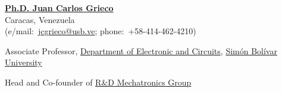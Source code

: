 \documentclass[10pt]{article}
\renewcommand{\section}[1]{\pagebreak[3]%
    \vspace{1.3\baselineskip}%
    \phantomsection\addcontentsline{toc}{section}{#1}%
    \noindent\llap{\scshape\smash{\parbox[t]{\marginparwidth}{\hyphenpenalty=10000\raggedright #1}}}%
    \vspace{-\baselineskip}\par}
\newcommand{\halfblankline}{\quad\vspace{-0.5\baselineskip}\pagebreak[3]}
\begin{document}
\halfblankline

\href{http://www.labc.usb.ve/mecatronica/quienes_somos.html}
{\textbf{Ph.D. Juan Carlos Grieco}}\\
Caracas, Venezuela\\
(e\-/mail:~\href{mailto:jcgrieco@usb.ve}{jcgrieco@usb.ve}; phone:~+58-414-462-4210)
%
\begin{innerlist}
    \item Associate Professor,
        \href{http://www.labc.usb.ve/EC/}{Department of Electronic and Circuits},
        \href{http://www.usb.ve/}{Simón Bolívar University}

    \item Head and Co-founder of \href{http://www.labc.usb.ve/mecatronica/}{R\&D Mechatronics Group}
\end{innerlist}


%
\end{document}

